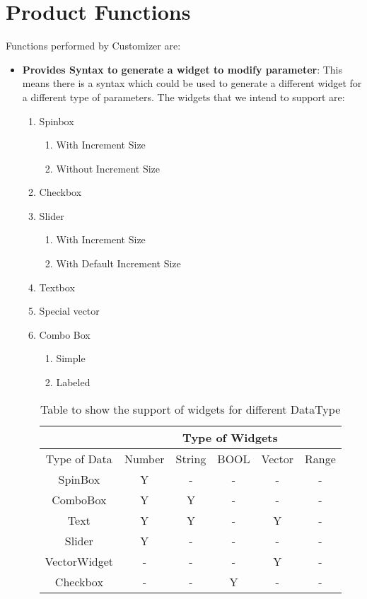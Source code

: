 \section{Product Functions}

Functions performed by Customizer are:
\begin{itemize}
    \item {\bf Provides Syntax to generate a widget to modify parameter}: This means there is a syntax which could be used to generate a different widget for a different type of parameters.
    The widgets that we intend to support are:
    \begin{enumerate}
        \item Spinbox
        \begin{enumerate}
            \item With Increment Size
            \item Without Increment Size
        \end{enumerate}
        \item Checkbox
        \item Slider
        \begin{enumerate}
            \item With Increment Size
            \item With Default Increment Size
        \end{enumerate}
        \item Textbox
        \item Special vector
        \item Combo Box
        \begin{enumerate}
            \item Simple
            \item Labeled
        \end{enumerate}
       
        \begin{table}[h]
            \centering
            \caption{Table to show the support of widgets for different DataType}
            \begin{tabular}{ |c|c|c|c|c|c| }
                \hline
                & \multicolumn{5}{|c|}{Type of Widgets} \\
                \hline
                Type of Data&    Number&    String&    BOOL &Vector &Range     \\ [0.5ex]
                \hline
                SpinBox&Y&    -&    -&    -&    - \\ \hline
                ComboBox&    Y&    Y&    -&    -&    - \\ \hline
                Text&    Y&    Y&    -&    Y&    - \\ \hline
                Slider&    Y&    -&    -&    -&    - \\ \hline
                VectorWidget&    -&    -&    -&    Y&- \\ \hline
                Checkbox&    -&    -&    Y&    -&    - \\ [1ex]
                \hline
            \end{tabular}


\end{table}
\end{enumerate}
\end{itemize}
